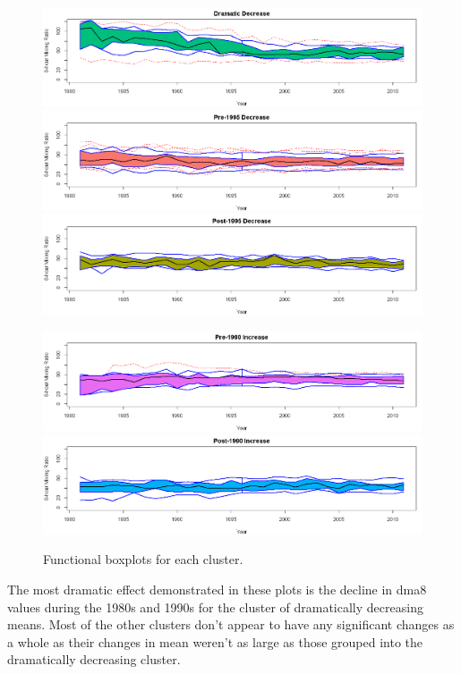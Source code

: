\documentclass[11pt, oneside]{article}
\theoremstyle{definition}
\begin{document}
\begin{figure}[H]
    \centering
    \includegraphics[width=0.9\linewidth]{plots/functional_boxplots/clust3.png}
    \includegraphics[width=0.9\linewidth]{plots/functional_boxplots/clust1.png}
    \includegraphics[width=0.9\linewidth]{plots/functional_boxplots/clust2.png}
\end{figure}
\begin{figure}[H]\ContinuedFloat
    \includegraphics[width=0.9\linewidth]{plots/functional_boxplots/clust5.png}
    \includegraphics[width=0.9\linewidth]{plots/functional_boxplots/clust4.png}
    \caption{Functional boxplots for each cluster.}
    \label{fxn_box}
\end{figure}

The most dramatic effect demonstrated in these plots is the decline in dma8 values during the 1980s and 1990s for the cluster of dramatically decreasing means. Most of the other clusters don't appear to have any significant changes as a whole as their changes in mean weren't as large as those grouped into the dramatically decreasing cluster.
\end{document}
